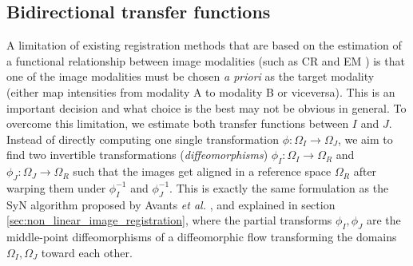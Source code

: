 \subsection{Bidirectional transfer functions}
A limitation of existing registration methods that are based on the estimation of a functional relationship between image modalities (such as CR and EM \cite{Roche1998, Roche2000, Arce-santana2014}) is that one of the image modalities must be chosen \emph{a priori} as the target modality (either map intensities from modality A to modality B or viceversa). This is an important decision and what choice is the best may not be obvious in general. To overcome this limitation, we estimate both transfer functions between $I$ and $J$. Instead of directly computing one single transformation $\phi:\Omega_{I} \rightarrow \Omega_{J}$, we aim to find two invertible transformations (\emph{diffeomorphisms}) $\phi_{I}:\Omega_{I}\rightarrow \Omega_{R}$ and $\phi_{J}:\Omega_{J}\rightarrow \Omega_{R}$ such that the images get aligned in a reference space $\Omega_{R}$ after warping them under $\phi_{I}^{-1}$ and $\phi_{J}^{-1}$. This is exactly the same formulation as the SyN algorithm proposed by Avants {\it et al.} \cite{Avants2011}, and explained in section \ref{sec:non_linear_image_registration}, where the partial transforms $\phi_{I}, \phi_{J}$ are the middle-point diffeomorphisms of a diffeomorphic flow transforming the domains $\Omega_{I}, \Omega_{J}$ toward each other.\\

